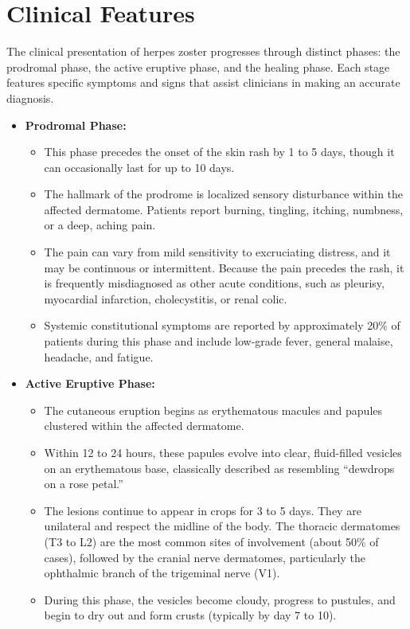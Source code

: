 \section*{Clinical Features}
The clinical presentation of herpes zoster progresses through distinct phases: the prodromal phase, the active eruptive phase, and the healing phase. Each stage features specific symptoms and signs that assist clinicians in making an accurate diagnosis.

\begin{itemize}
    \item \textbf{Prodromal Phase:}
    \begin{itemize}
        \item This phase precedes the onset of the skin rash by 1 to 5 days, though it can occasionally last for up to 10 days.
        \item The hallmark of the prodrome is localized sensory disturbance within the affected dermatome. Patients report burning, tingling, itching, numbness, or a deep, aching pain.
        \item The pain can vary from mild sensitivity to excruciating distress, and it may be continuous or intermittent. Because the pain precedes the rash, it is frequently misdiagnosed as other acute conditions, such as pleurisy, myocardial infarction, cholecystitis, or renal colic.
        \item Systemic constitutional symptoms are reported by approximately 20\% of patients during this phase and include low-grade fever, general malaise, headache, and fatigue.
    \end{itemize}
    \item \textbf{Active Eruptive Phase:}
    \begin{itemize}
        \item The cutaneous eruption begins as erythematous macules and papules clustered within the affected dermatome.
        \item Within 12 to 24 hours, these papules evolve into clear, fluid-filled vesicles on an erythematous base, classically described as resembling ``dewdrops on a rose petal.''
        \item The lesions continue to appear in crops for 3 to 5 days. They are unilateral and respect the midline of the body. The thoracic dermatomes (T3 to L2) are the most common sites of involvement (about 50\% of cases), followed by the cranial nerve dermatomes, particularly the ophthalmic branch of the trigeminal nerve (V1).
        \item During this phase, the vesicles become cloudy, progress to pustules, and begin to dry out and form crusts (typically by day 7 to 10).

\end{itemize}
\end{itemize}
